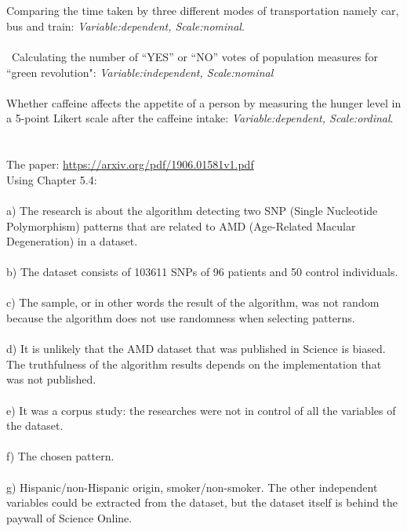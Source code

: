 \documentclass[a4paper,12pt]{article}
\newcommand{\<}{\langle}
\renewcommand{\>}{\rangle}
\newcommand{\1}{\mathbbm{1}}
\begin{document}
\section{}
Comparing the time taken by three different modes of transportation namely car, bus
and train: \textit{Variable:dependent, Scale:nominal}.\\\\\
Calculating the number of “YES” or “NO” votes of population measures for “green revolution": \textit{Variable:independent, Scale:nominal}  \\\\
Whether caffeine affects the appetite of a person by measuring the hunger level in a 5-point Likert scale after the caffeine intake: \textit{Variable:dependent, Scale:ordinal}.

\section{}
The paper: \url{https://arxiv.org/pdf/1906.01581v1.pdf} \\
Using Chapter 5.4: \\\\
a) The research is about the algorithm detecting two SNP (Single Nucleotide Polymorphism) patterns that are related to AMD (Age-Related Macular Degeneration) in a dataset. \\\\
b) The dataset consists of 103611 SNPs of 96 patients and 50 control individuals. \\\\
c) The sample, or in other words the result of the algorithm, was not random because the algorithm does not use randomness when selecting patterns. \\\\
d) It is unlikely that the AMD dataset that was published in Science is biased. The truthfulness of the algorithm results depends on the implementation that was not published. \\\\
e) It was a corpus study: the researches were not in control of all the variables of the dataset. \\\\
f) The chosen pattern. \\\\
g) Hispanic/non-Hispanic origin, smoker/non-smoker. The other independent variables could be extracted from the dataset, but the dataset itself is behind the paywall of Science Online. \\\\
\end{document}

